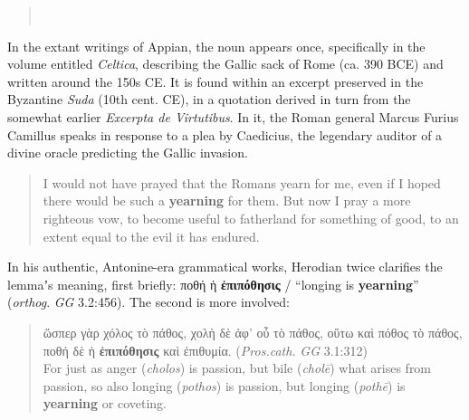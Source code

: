 \vspace*{3mm} 
 \begin{quote} \\[1mm] %
 \end{quote} %
 \vspace*{3mm} 

In the extant writings of Appian, %
the noun appears once, specifically in the volume entitled \textit{Celtica}, %
describing the Gallic sack of Rome (ca. 390 BCE) %
and written around the 150s CE. %
It is found within an excerpt preserved in the Byzantine \textit{Suda} (10th cent. CE), %
in a quotation derived in turn from the somewhat earlier \textit{Excerpta de Virtutibus}. %
In it, the Roman general Marcus Furius Camillus speaks %
in response to a plea by Caedicius, the legendary auditor of %
a divine oracle predicting the Gallic invasion. %

\vspace*{3mm} 
 \begin{quote} \clearpage %
 I would not have prayed that the Romans yearn for me, %
 even if I hoped there would be such a \textbf{yearning} for them. %
 But now I pray a more righteous vow, %
 to become useful to fatherland for something of good, %
 to an extent equal to the evil it has endured. %
 \end{quote} %
 \vspace*{3mm}

In his authentic, Antonine-era grammatical works, %
Herodian twice clarifies the lemmaʼs meaning, %
first briefly: ποθή ἡ \textbf{ἐπιπόθησις} / “longing is \textbf{yearning}” (\textit{orthog}. \textit{GG} 3.2:456). %
The second is more involved: %

\vspace*{3mm} 
 \begin{quote} ὥσπερ γὰρ χόλος τὸ πάθος, %
  χολὴ δὲ ἀφ’ οὗ τὸ πάθος, οὕτω καὶ πόθος τὸ πάθος, %
  ποθή δὲ ἡ \textbf{ἐπιπόθησις} καὶ ἐπιθυμία. (\textit{Pros.cath.} \textit{GG} 3.1:312)\\[1mm] %
  For just as anger (\textit{cholos}) is passion, %
  but bile (\textit{cholē}) what arises from passion, %
  so also longing (\textit{pothos}) is passion, %
  but longing (\textit{pothē}) is \textbf{yearning} or coveting. %
  \end{quote} %
 \vspace*{3mm} %

